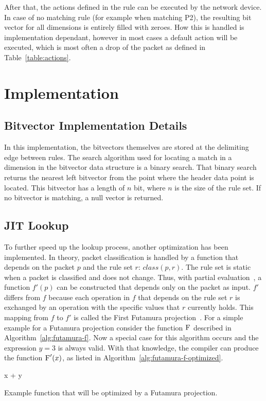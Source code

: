 \documentclass[a4paper,
		12pt,
		parskip=full,
		titlepage
		]{scrartcl}
\begin{document}
After that, the actions defined in the rule can be executed by the network device.
In case of no matching rule (for example when matching P2), the resulting bit vector for all dimensions is entirely filled with zeroes.
How this is handled is implementation dependant, however in most cases a 
default action will be executed, which is most often a drop of the packet as defined in Table~\ref{table:actions}.

\section{Implementation}
\subsection{Bitvector Implementation Details}
In this implementation, the bitvectors themselves are stored at the delimiting edge
between rules.
The search algorithm used for locating a match in a dimension in the bitvector 
data structure is a binary search.
That binary search returns the nearest left bitvector from the point where 
the header data point is located.
This bitvector has a length of $n$ bit, where $n$ is the size of the rule set.
If no bitvector is matching, a null vector is returned.

\subsection{JIT Lookup}
To further speed up the lookup process, another optimization has been implemented.
In theory, packet classification is handled by a function that depends on the packet $p$ and the rule set $r$: $class(p, r)$.
The rule set is static when a packet is classified and does not change.
Thus, with partial evaluation~\cite{partial_eval}, a function $f'(p)$ can be constructed that depends only on the packet as input.
$f'$ differs from $f$ because each operation in $f$ that depends on the 
rule set $r$ is exchanged by an operation with the specific values that $r$ currently holds.
This mapping from $f$ to $f'$ is called the First Futamura projection~\cite{DBLP:journals/ngc/MogensenH88}.
For a simple example for a Futamura projection consider the function $\textsc{F}$ described in Algorithm~\ref{alg:futamura-f}.
Now a special case for this algorithm occurs and the expression $y = 3$ is always valid.
With that knowledge, the compiler can produce the function $\textsc{F}'(x)$, as listed in Algorithm~\ref{alg:futamura-f-optimized}.

\begin{algorithm}
\begin{algorithmic}[1]
    \State \Return x + y
\EndFunction
\end{algorithmic}
\caption{Example function that will be optimized by a Futamura projection.}
\label{alg:futamura-f}
\end{algorithm}
\end{document}
